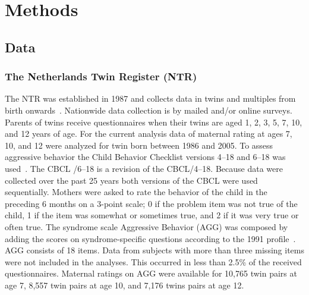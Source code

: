 ﻿\section{Methods}
\subsection{Data}
\subsubsection{The Netherlands Twin Register (NTR)}
The NTR was established in 1987 and collects data in twins and multiples from birth onwards~\cite{vanBeijsterveldt2013}.
Nationwide data collection is by mailed and/or online surveys.
Parents of twins receive questionnaires when their twins are aged 1, 2, 3, 5, 7, 10, and 12 years of age.
For the current analysis data of maternal rating at ages 7, 10, and 12 were analyzed for twin born between 1986 and 2005.
To assess aggressive behavior the Child Behavior Checklist versions 4--18 and 6--18 was used~\cite{Achenbach2010}.
The CBCL /6--18 is a revision of the CBCL/4--18.
Because data were collected over the past 25 years both versions of the CBCL were used sequentially.
Mothers were asked to rate the behavior of the child in the preceding 6 months on a 3-point scale; 0 if the problem item was not true of the child, 1 if the item was somewhat or sometimes true, and 2 if it was very true or often true.
The syndrome scale Aggressive Behavior (AGG) was composed by adding the scores on syndrome-specific questions according to the 1991 profile~\cite{Achenbach2010}.
AGG consists of 18 items.
Data from subjects with more than three missing items were not included in the analyses.
This occurred in less than 2.5\% of the received questionnaires.  Maternal ratings on AGG were available for 10,765 twin pairs at age 7, 8,557 twin pairs at age 10, and 7,176 twins pairs at age 12.

